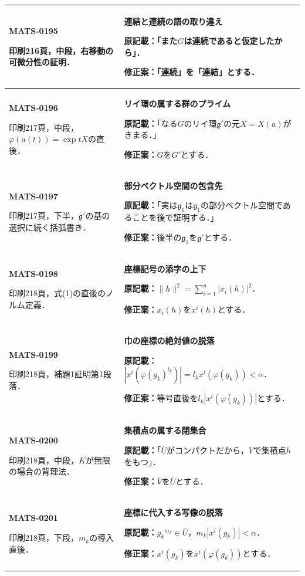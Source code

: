 \documentclass[a4paper,10pt]{ltjsarticle}
\begin{document}
\begin{longtable}{@{}>{\raggedright\arraybackslash}p{.19\linewidth}>{\raggedright\arraybackslash}p{.77\linewidth}@{}}
\hline
\hypertarget{MATS-0195}{}\textbf{MATS-0195}\par 印刷216頁，中段，右移動の可微分性の証明． & \textbf{連結と連続の語の取り違え}\par\textbf{原記載：}「また$G$は連続であると仮定したから」．\par\textbf{修正案：}「連続」を「連結」とする． \\[3pt]
\hline
\hypertarget{MATS-0196}{}\textbf{MATS-0196}\par 印刷217頁，中段，$\varphi(a(t))=\exp tX$の直後． & \textbf{リイ環の属する群のプライム}\par\textbf{原記載：}「なる$G$のリイ環$\mathfrak g'$の元$X=X(a)$がきまる．」\par\textbf{修正案：}$G$を$G'$とする． \\[3pt]
\hline
\hypertarget{MATS-0197}{}\textbf{MATS-0197}\par 印刷217頁，下半，$\mathfrak g'$の基の選択に続く括弧書き． & \textbf{部分ベクトル空間の包含先}\par\textbf{原記載：}「実は$\mathfrak g_1$は$\mathfrak g_1$の部分ベクトル空間であることを後で証明する．」\par\textbf{修正案：}後半の$\mathfrak g_1$を$\mathfrak g'$とする． \\[3pt]
\hline
\hypertarget{MATS-0198}{}\textbf{MATS-0198}\par 印刷218頁，式(1)の直後のノルム定義． & \textbf{座標記号の添字の上下}\par\textbf{原記載：}$\|h\|^2=\sum_{i=1}^n|x_i(h)|^2$．\par\textbf{修正案：}$x_i(h)$を$x^i(h)$とする． \\[3pt]
\hline
\hypertarget{MATS-0199}{}\textbf{MATS-0199}\par 印刷218頁，補題1証明第1段落． & \textbf{巾の座標の絶対値の脱落}\par\textbf{原記載：}$|x^i(\varphi(g_k)^{l_k})|=l_kx^i(\varphi(g_k))<\alpha$．\par\textbf{修正案：}等号直後を$l_k|x^i(\varphi(g_k))|$とする． \\[3pt]
\hline
\hypertarget{MATS-0200}{}\textbf{MATS-0200}\par 印刷218頁，中段，$K$が無限の場合の背理法． & \textbf{集積点の属する閉集合}\par\textbf{原記載：}「$\bar U$がコンパクトだから，$\bar V$で集積点$h$をもつ」．\par\textbf{修正案：}$\bar V$を$\bar U$とする． \\[3pt]
\hline
\hypertarget{MATS-0201}{}\textbf{MATS-0201}\par 印刷218頁，下段，$m_k$の導入直後． & \textbf{座標に代入する写像の脱落}\par\textbf{原記載：}$g_k{}^{m_k}\in\bar U$，$m_k|x^i(g_k)|<\alpha$．\par\textbf{修正案：}$x^i(g_k)$を$x^i(\varphi(g_k))$とする． \\[3pt]

\end{longtable}
\end{document}
